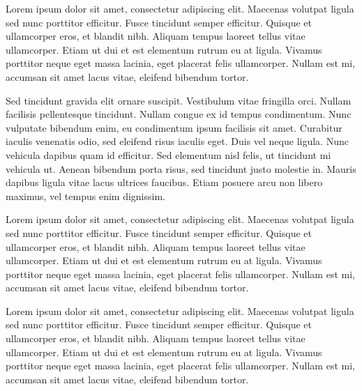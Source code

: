 Lorem ipsum dolor sit amet, consectetur adipiscing elit. Maecenas volutpat ligula sed nunc porttitor efficitur. Fusce tincidunt semper efficitur. Quisque et ullamcorper eros, et blandit nibh. Aliquam tempus laoreet tellus vitae ullamcorper. Etiam ut dui et est elementum rutrum eu at ligula. Vivamus porttitor neque eget massa lacinia, eget placerat felis ullamcorper. Nullam est mi, accumsan sit amet lacus vitae, eleifend bibendum tortor.\par
Sed tincidunt gravida elit ornare suscipit. Vestibulum vitae fringilla orci. Nullam facilisis pellentesque tincidunt. Nullam congue ex id tempus condimentum. Nunc vulputate bibendum enim, eu condimentum ipsum facilisis sit amet. Curabitur iaculis venenatis odio, sed eleifend risus iaculis eget. Duis vel neque ligula. Nunc vehicula dapibus quam id efficitur. Sed elementum nisl felis, ut tincidunt mi vehicula ut. Aenean bibendum porta risus, sed tincidunt justo molestie in. Mauris dapibus ligula vitae lacus ultrices faucibus. Etiam posuere arcu non libero maximus, vel tempus enim dignissim.\par 
Lorem ipsum dolor sit amet, consectetur adipiscing elit. Maecenas volutpat ligula sed nunc porttitor efficitur. Fusce tincidunt semper efficitur. Quisque et ullamcorper eros, et blandit nibh. Aliquam tempus laoreet tellus vitae ullamcorper. Etiam ut dui et est elementum rutrum eu at ligula. Vivamus porttitor neque eget massa lacinia, eget placerat felis ullamcorper. Nullam est mi, accumsan sit amet lacus vitae, eleifend bibendum tortor.\par
Lorem ipsum dolor sit amet, consectetur adipiscing elit. Maecenas volutpat ligula sed nunc porttitor efficitur. Fusce tincidunt semper efficitur. Quisque et ullamcorper eros, et blandit nibh. Aliquam tempus laoreet tellus vitae ullamcorper. Etiam ut dui et est elementum rutrum eu at ligula. Vivamus porttitor neque eget massa lacinia, eget placerat felis ullamcorper. Nullam est mi, accumsan sit amet lacus vitae, eleifend bibendum tortor.\par